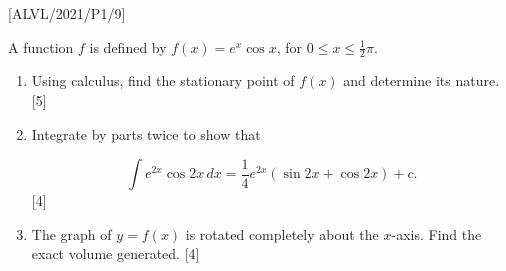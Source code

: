 \item {[}ALVL/2021/P1/9{]}

A function $f$ is defined by $f\left(x\right)=e^{x}\cos x$, for
$0\leq x\leq\frac{1}{2}\pi$. 
\begin{enumerate}
\item Using calculus, find the stationary point of $f(x)$ and determine
its nature. \hfill{}{[}5{]}
\item Integrate by parts twice to show that

\[
\int e^{2x}\cos2x\,dx=\frac{1}{4}e^{2x}\left(\sin2x+\cos2x\right)+c.
\]
\hfill{}{[}4{]}
\item The graph of $y=f(x)$ is rotated completely about the $x$-axis.
Find the exact volume generated.\hfill{} {[}4{]}
\end{enumerate}
